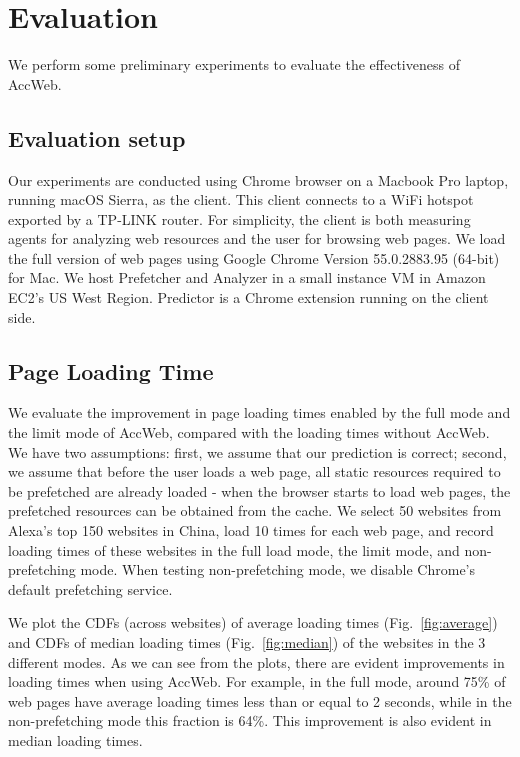 \section{Evaluation}
\label{sec:eval}

We perform some preliminary experiments to evaluate the effectiveness of AccWeb.

\subsection{Evaluation setup}

Our experiments are conducted using Chrome browser on a Macbook Pro laptop, running macOS Sierra, as the client. This client connects to a WiFi hotspot exported by a TP-LINK router. For simplicity, the client is both measuring agents for analyzing web resources and the user for browsing web pages. We load the full version of web pages using Google Chrome Version 55.0.2883.95 (64-bit) for Mac. We host Prefetcher and Analyzer in a small instance VM in Amazon EC2's US West Region. Predictor is a Chrome extension running on the client side. %


\subsection{Page Loading Time}

We evaluate the improvement in page loading times enabled by the full mode and the limit mode of AccWeb, compared with the loading times without AccWeb. We have two assumptions: first, we assume that our prediction is correct; second, we assume that before the user loads a web page, all static resources required to be prefetched are already loaded - when the browser starts to load web pages, the prefetched resources can be obtained from the cache. We select 50 websites from Alexa's top 150 websites in China, load 10 times for each web page, and record loading times of these websites in the full load mode, the limit mode, and non-prefetching mode. When testing non-prefetching mode, we disable Chrome's default prefetching service.



We plot the CDFs (across websites) of average loading times (Fig.~\ref{fig:average}) and CDFs of median loading times (Fig.~\ref{fig:median}) of the websites in the 3 different modes. As we can see from the plots, there are evident improvements in loading times when using AccWeb. For example, in the full mode, around 75\% of web pages have average loading times less than or equal to 2 seconds, while in the non-prefetching mode this fraction is 64\%. This improvement is also evident in median loading times.

